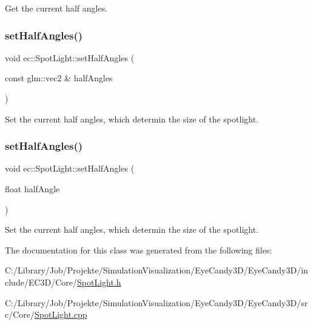 Get the current half angles. \mbox{\label{classec_1_1_spot_light_a70ee7996e77f4961cca8864cea037906}} 
\subsubsection{\texorpdfstring{set\+Half\+Angles()}{setHalfAngles()}\hspace{0.1cm}{\footnotesize\ttfamily [1/2]}}
{\footnotesize\ttfamily void ec\+::\+Spot\+Light\+::set\+Half\+Angles (\begin{DoxyParamCaption}\item[{const glm\+::vec2 \&}]{half\+Angles }\end{DoxyParamCaption})}

Set the current half angles, which determin the size of the spotlight. \mbox{\label{classec_1_1_spot_light_a0b9a13abe376b5e0513f243036b41af9}} 
\subsubsection{\texorpdfstring{set\+Half\+Angles()}{setHalfAngles()}\hspace{0.1cm}{\footnotesize\ttfamily [2/2]}}
{\footnotesize\ttfamily void ec\+::\+Spot\+Light\+::set\+Half\+Angles (\begin{DoxyParamCaption}\item[{float}]{half\+Angle }\end{DoxyParamCaption})}

Set the current half angles, which determin the size of the spotlight. 

The documentation for this class was generated from the following files\+:\begin{DoxyCompactItemize}
\item 
C\+:/\+Library/\+Job/\+Projekte/\+Simulation\+Visualization/\+Eye\+Candy3\+D/\+Eye\+Candy3\+D/include/\+E\+C3\+D/\+Core/\mbox{\hyperlink{_spot_light_8h}{Spot\+Light.\+h}}\item 
C\+:/\+Library/\+Job/\+Projekte/\+Simulation\+Visualization/\+Eye\+Candy3\+D/\+Eye\+Candy3\+D/src/\+Core/\mbox{\hyperlink{_spot_light_8cpp}{Spot\+Light.\+cpp}}\end{DoxyCompactItemize}
